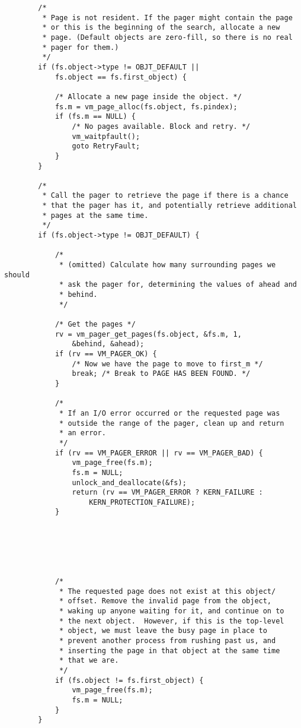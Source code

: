 \documentclass[shortabstract, english]{iithesis}
\newenvironment{code}{}{}
\begin{document}
\begin{code}
\begin{verbatim}
        /*
         * Page is not resident. If the pager might contain the page
         * or this is the beginning of the search, allocate a new
         * page. (Default objects are zero-fill, so there is no real
         * pager for them.)
         */
        if (fs.object->type != OBJT_DEFAULT ||
            fs.object == fs.first_object) {

            /* Allocate a new page inside the object. */
            fs.m = vm_page_alloc(fs.object, fs.pindex);
            if (fs.m == NULL) {
                /* No pages available. Block and retry. */
                vm_waitpfault();
                goto RetryFault;
            }
        }

        /*
         * Call the pager to retrieve the page if there is a chance
         * that the pager has it, and potentially retrieve additional
         * pages at the same time.
         */
        if (fs.object->type != OBJT_DEFAULT) {

            /*
             * (omitted) Calculate how many surrounding pages we should
             * ask the pager for, determining the values of ahead and
             * behind.
             */

            /* Get the pages */
            rv = vm_pager_get_pages(fs.object, &fs.m, 1,
                &behind, &ahead);
            if (rv == VM_PAGER_OK) {
                /* Now we have the page to move to first_m */
                break; /* Break to PAGE HAS BEEN FOUND. */
            }

            /*
             * If an I/O error occurred or the requested page was
             * outside the range of the pager, clean up and return
             * an error.
             */
            if (rv == VM_PAGER_ERROR || rv == VM_PAGER_BAD) {
                vm_page_free(fs.m);
                fs.m = NULL;
                unlock_and_deallocate(&fs);
                return (rv == VM_PAGER_ERROR ? KERN_FAILURE :
                    KERN_PROTECTION_FAILURE);
            }






            /*
             * The requested page does not exist at this object/
             * offset. Remove the invalid page from the object,
             * waking up anyone waiting for it, and continue on to
             * the next object.  However, if this is the top-level
             * object, we must leave the busy page in place to
             * prevent another process from rushing past us, and
             * inserting the page in that object at the same time
             * that we are.
             */
            if (fs.object != fs.first_object) {
                vm_page_free(fs.m);
                fs.m = NULL;
            }
        }


\end{verbatim}
\end{code}
\end{document}
